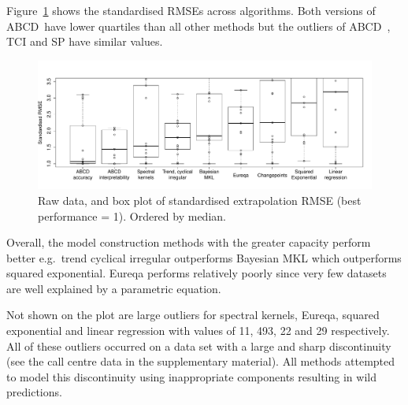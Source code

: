 \documentclass[letterpaper]{article}
\def\eg{e.g.\ }
\newcommand{\procedurename}{ABCD\ }
\begin{document}
Figure~\ref{fig:box_extrap_dist} shows the standardised RMSEs across algorithms.
Both versions of \procedurename have lower quartiles than all other methods but the outliers of \procedurename, TCI and SP have similar values.

\begin{figure}[ht]
\centering
\includegraphics[width=\textwidth]{figures/box_extrap_wide}
\caption{
Raw data, and box plot of standardised extrapolation RMSE (best performance = 1).
Ordered by median.
}
\label{fig:box_extrap_dist}
\end{figure}

Overall, the model construction methods with the greater capacity perform better \eg trend cyclical irregular outperforms Bayesian MKL which outperforms squared exponential.
Eureqa performs relatively poorly since very few datasets are well explained by a parametric equation.

Not shown on the plot are large outliers for spectral kernels, Eureqa, squared exponential and linear regression with values of 11, 493, 22 and 29 respectively.
All of these outliers occurred on a data set with a large and sharp discontinuity (see the call centre data in the supplementary material).
All methods attempted to model this discontinuity using inappropriate components resulting in wild predictions.


\end{document}
